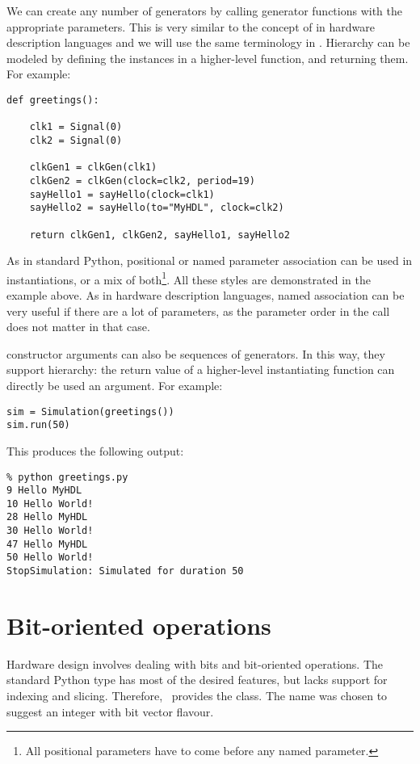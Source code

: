 We can create any number of generators by calling generator functions
with the appropriate parameters. This is very similar to the concept of
 in hardware description languages and we will use
the same terminology in \myhdl{}. Hierarchy can be modeled by defining
the instances in a higher-level function, and returning them. For
example: 

\begin{verbatim}
def greetings():

    clk1 = Signal(0)
    clk2 = Signal(0)
    
    clkGen1 = clkGen(clk1)
    clkGen2 = clkGen(clock=clk2, period=19)
    sayHello1 = sayHello(clock=clk1)
    sayHello2 = sayHello(to="MyHDL", clock=clk2)

    return clkGen1, clkGen2, sayHello1, sayHello2

\end{verbatim}
As in standard Python, positional or named parameter association can
be used in instantiations, or a mix of both\footnote{All positional
parameters have to come before any named parameter.}. All these styles
are demonstrated in the example above. As in hardware description
languages, named association can be very useful if there are a lot of
parameters, as the parameter order in the call does not matter in that
case.

 constructor arguments can also be sequences of
generators. In this way, they support hierarchy: the return value of a
higher-level instantiating function can directly be used an
argument. For example:

\begin{verbatim}
sim = Simulation(greetings())
sim.run(50)

\end{verbatim}

This produces the following output:

\begin{verbatim}
% python greetings.py
9 Hello MyHDL
10 Hello World!
28 Hello MyHDL
30 Hello World!
47 Hello MyHDL
50 Hello World!
StopSimulation: Simulated for duration 50

\end{verbatim}


\section{Bit-oriented operations}

Hardware design involves dealing with bits and bit-oriented
operations. The standard Python type  has most of the
desired features, but lacks support for indexing and
slicing. Therefore,
\myhdl\ provides the  class. The name was chosen to
suggest an integer with bit vector flavour.

